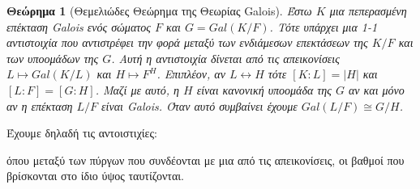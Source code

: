 \documentclass[oneside,a4paper]{article}
\newtheorem{theorem}{Θεώρημα}
\newcommand {\tl}{\textlatin}
\begin{document}
\begin{theorem}[Θεμελιώδες Θεώρημα της Θεωρίας \tl{Galois}]
	Έστω $K$ μια πεπερασμένη επέκταση \tl{Galois} ενός σώματος $F$ και $G=Gal(K/F)$. Τότε υπάρχει μια 1-1 αντιστοιχία που αντιστρέφει την φορά μεταξύ των ενδιάμεσων επεκτάσεων της $K/F$ και των υποομάδων της $G$. Αυτή η αντιστοιχία δίνεται από τις απεικονίσεις $L \mapsto Gal(K/L)$ και $H \mapsto F^H$. Επιπλέον, αν $L\leftrightarrow H$ τότε $[K:L] = |H|$ και $[L:F] = [G:H]$. Μαζί με αυτό, η $H$ είναι κανονική υποομάδα της $G$ αν και μόνο αν η επέκταση $L/F$ είναι \tl{Galois}. Όταν αυτό συμβαίνει έχουμε $Gal(L/F) \cong G/H$.
\end{theorem}
Έχουμε δηλαδή τις αντοιστιχίες:
\begin{center}
\end{center}
όπου μεταξύ των πύργων που συνδέονται με μια από τις απεικονίσεις, οι βαθμοί που βρίσκονται στο ίδιο ύψος ταυτίζονται.
\end{document}

